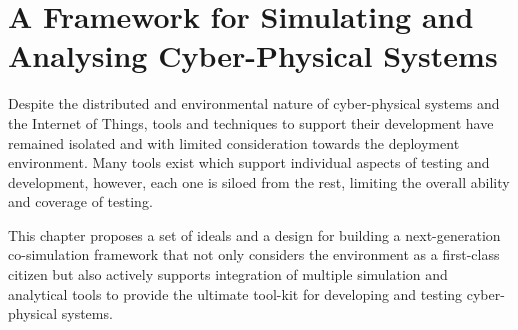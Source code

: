 \chapter{A Framework for Simulating and Analysing Cyber-Physical Systems}






Despite the distributed and environmental nature of cyber-physical systems and the Internet of Things, tools and techniques to support their development have remained isolated and with limited consideration towards the deployment environment. Many tools exist which support individual aspects of testing and development, however, each one is siloed from the rest, limiting the overall ability and coverage of testing.

This chapter proposes a set of ideals and a design for building a next-generation co-simulation framework that not only considers the environment as a first-class citizen but also actively supports integration of multiple simulation and analytical tools to provide the ultimate tool-kit for developing and testing cyber-physical systems.




